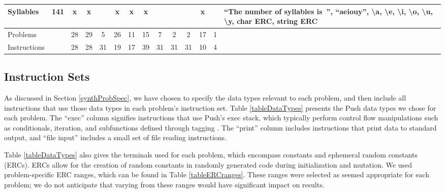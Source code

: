 \documentclass{sig-alternate}
\begin{document}
\begin{table*}
\begin{tabular}{>{\raggedright}p{2.6cm}rccccccccccc>{\raggedright}p{5.5cm}}
Syllables                  & 141             & x    & x       &       & x       & x    & x      &                    &                  &                   & x     &            & ``The number of syllables is~'', ``aeiouy'', \textbackslash a, \textbackslash e, \textbackslash i, \textbackslash o, \textbackslash u, \textbackslash y, char ERC, string ERC                                                   \tabularnewline
\midrule
\rowcolor{white} Problems                      &                 & 28   & 29      & 5     & 26      & 11   & 15     & 7                  & 2                & 2                 & 17    & 1          &                                                                                                                                                                                                                             \tabularnewline
\rowcolor{white} Instructions     &                 & 28   & 28      & 31    & 19      & 17   & 39     & 31                 & 31               & 31                & 10    & 4          &                                                                                                                                                                                                                             \tabularnewline
\bottomrule
\end{tabular}
\end{table*}

\subsection{Instruction Sets}

As discussed in Section \ref{synthProbSpec}, we have chosen to specify the data types relevant to each problem, and then include all instructions that use those data types in each problem's instruction set. Table \ref{tableDataTypes} presents the Push data types we chose for each problem. The ``exec'' column signifies instructions that use Push's exec stack, which typically perform control flow manipulations such as conditionals, iteration, and subfunctions defined through tagging \cite{Spector:2011:GECCO}. The ``print'' column includes instructions that print data to standard output, and ``file input'' includes a small set of file reading instructions. 

Table \ref{tableDataTypes} also gives the terminals used for each problem, which encompass constants and ephemeral random constants (ERCs). ERCs allow for the creation of random constants in randomly generated code during initialization and mutation. We used problem-specific ERC ranges, which can be found in Table \ref{tableERCranges}. These ranges were selected as seemed appropriate for each problem; we do not anticipate that varying from these ranges would have significant impact on results.
\end{document}

